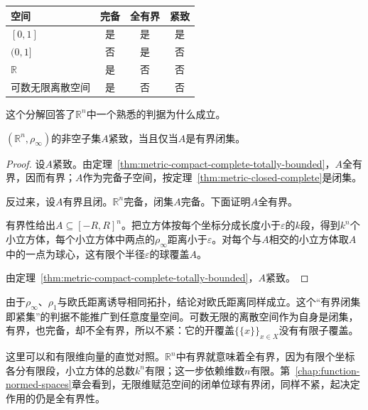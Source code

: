 \begin{BookInlineTable}
  \centering
  \small
  \begin{tabular}{@{}lccc@{}}
    \toprule
    空间 & 完备 & 全有界 & 紧致\\
    \midrule
    $[0,1]$ & 是 & 是 & 是\\
    $(0,1]$ & 否 & 是 & 否\\
    $\mathbb R$ & 是 & 否 & 否\\
    可数无限离散空间 & 是 & 否 & 否\\
    \bottomrule
  \end{tabular}
  \caption{完备性与全有界性的组合。$(0,1]$中柯西列$1/n$失去了极限；$\mathbb R$中点列$x_n=n$两两距离至少为$1$，选不出柯西子列；离散空间有界且闭，却同样选不出柯西子列。}
  \label{tab:metric-compact-examples}
\end{BookInlineTable}

这个分解回答了$\mathbb R^n$中一个熟悉的判据为什么成立。

\begin{theorem}[欧氏空间中的紧集]
\label{thm:metric-heine-borel}
$(\mathbb R^n,\rho_\infty)$的非空子集$A$紧致，当且仅当$A$是有界闭集。
\end{theorem}

\begin{proof}
设$A$紧致。由定理~\ref{thm:metric-compact-complete-totally-bounded}，$A$全有界，因而有界；$A$作为完备子空间，按定理~\ref{thm:metric-closed-complete}是闭集。

反过来，设$A$有界且闭。$\mathbb R^n$完备，闭集$A$完备。下面证明$A$全有界。

有界性给出$A\subseteq[-R,R]^n$。把立方体按每个坐标分成长度小于$\varepsilon$的$k$段，得到$k^n$个小立方体，每个小立方体中两点的$\rho_\infty$距离小于$\varepsilon$。对每个与$A$相交的小立方体取$A$中的一点为球心，这有限个半径$\varepsilon$的球覆盖$A$。

由定理~\ref{thm:metric-compact-complete-totally-bounded}，$A$紧致。
\end{proof}

由于$\rho_\infty$、$\rho_1$与欧氏距离诱导相同拓扑，结论对欧氏距离同样成立。这个“有界闭集即紧集”的判据不能推广到任意度量空间。可数无限的离散空间作为自身是闭集，有界，也完备，却不全有界，所以不紧：它的开覆盖$\{\{x\}\}_{x\in X}$没有有限子覆盖。

这里可以和有限维向量的直觉对照。$\mathbb R^n$中有界就意味着全有界，因为有限个坐标各分有限段，小立方体的总数$k^n$有限；这一步依赖维数$n$有限。第~\ref{chap:function-normed-spaces}章会看到，无限维赋范空间的闭单位球有界闭，同样不紧，起决定作用的仍是全有界性。

